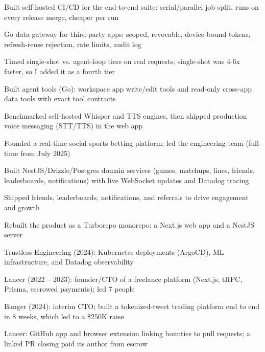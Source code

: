 \documentclass[print]{jack-resume}
\begin{document}
\begin{tightemize}
    \item Built self-hosted CI/CD for the end-to-end suite: serial/parallel job split, runs on every release merge, cheaper per run
    \item Go data gateway for third-party apps: scoped, revocable, device-bound tokens, refresh-reuse rejection, rate limits, audit log
    \item Timed single-shot vs. agent-loop tiers on real requests; single-shot was 4-6x faster, so I added it as a fourth tier
    \item Built agent tools (Go): workspace app write/edit tools and read-only cross-app data tools with exact tool contracts
    \item Benchmarked self-hosted Whisper and TTS engines, then shipped production voice messaging (STT/TTS) in the web app
\end{tightemize}
\sectionsep

\begin{tightemize}
    \item Founded a real-time social sports betting platform; led the engineering team (full-time from July 2025)
    \item Built NestJS/Drizzle/Postgres domain services (games, matchups, lines, friends, leaderboards, notifications) with live WebSocket updates and Datadog tracing
    \item Shipped friends, leaderboards, notifications, and referrals to drive engagement and growth
    \item Rebuilt the product as a Turborepo monorepo: a Next.js web app and a NestJS server
\end{tightemize}
\sectionsep

\begin{tightemize}
    \item Trustless Engineering (2024): Kubernetes deployments (ArgoCD), ML infrastructure, and Datadog observability
    \item Lancer (2022 -- 2023): founder/CTO of a freelance platform (Next.js, tRPC, Prisma, escrowed payments); led 7 people
    \item Banger (2024): interim CTO; built a tokenized-tweet trading platform end to end in 8 weeks, which led to a \$250K raise
    \item Lancer: GitHub app and browser extension linking bounties to pull requests; a linked PR closing paid its author from escrow
\end{tightemize}
\sectionsep
\end{document}
